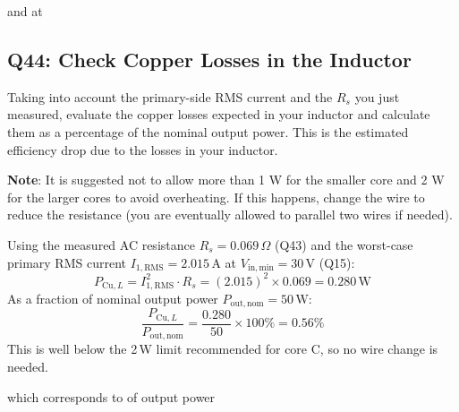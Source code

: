 \documentclass{PELsmallreport}
\begin{document}
  and  at  \hfill {}







\subsection{Q44: Check Copper Losses in the Inductor}
Taking into account the primary-side RMS current and the $R_s$ you just measured, evaluate the copper losses expected in your inductor and calculate them as a percentage of the nominal output power. 
This is the estimated efficiency drop due to the losses in your inductor. 


\textbf{Note}: It is suggested not to allow more than 1 W for the smaller core and 2 W for the larger cores to avoid overheating. 
If this happens, change the wire to reduce the resistance (you are eventually allowed to parallel two wires if needed). \\

\begin{framed}
Using the measured AC resistance $R_s = 0.069\,\Omega$ (Q43) and the worst-case primary RMS current $I_{1,\mathrm{RMS}} = 2.015\,\mathrm{A}$ at $V_\mathrm{in,min}=30\,\mathrm{V}$ (Q15):
\begin{equation}
    P_{\mathrm{Cu},L} = I_{1,\mathrm{RMS}}^2 \cdot R_s = (2.015)^2 \times 0.069 = 0.280\,\mathrm{W}
\end{equation}
As a fraction of nominal output power $P_\mathrm{out,nom} = 50\,\mathrm{W}$:
\begin{equation}
    \frac{P_{\mathrm{Cu},L}}{P_\mathrm{out,nom}} = \frac{0.280}{50} \times 100\% = 0.56\%
\end{equation}
This is well below the 2\,W limit recommended for core C, so no wire change is needed.
\end{framed}

 which corresponds to  of output power \hfill{}
\end{document}
